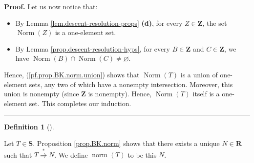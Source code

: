 \documentclass[numbers=enddot,12pt,final,onecolumn,notitlepage]{scrartcl}%
\theoremstyle{definition}
\newtheorem{defi}[theo]{Definition}
\newenvironment{definition}[1][]
{\begin{defi}[#1]\begin{leftbar}}
{\end{leftbar}\end{defi}}
\newenvironment{proof}[1][Proof]{\noindent\textbf{#1.} }{\ \rule{0.5em}{0.5em}}
\begin{document}
\begin{proof}
Let us now notice that:

\begin{itemize}
\item By Lemma \ref{lem.descent-resolution-props} \textbf{(d)}, for every $Z\in\mathbf{Z}$, the set $\operatorname*{Norm}\left( Z\right)  $ is a one-element set.

\item By Lemma \ref{prop.descent-resolution-hyps}, for every $B\in\mathbf{Z}$ and $C\in\mathbf{Z}$, we have
$\operatorname*{Norm}\left(  B\right)  \cap\operatorname*{Norm}\left(
C\right)  \neq\varnothing$.
\end{itemize}

Hence, (\ref{pf.prop.BK.norm.union}) shows that $\operatorname*{Norm}\left(
T\right)  $ is a union of one-element sets, any two of which have a nonempty
intersection.
Moreover, this union is nonempty (since $\mathbf{Z}$ is nonempty). Hence,
$\operatorname*{Norm}\left(  T\right)  $ itself is a one-element set. This
completes our induction.
\end{proof}

\begin{definition}
Let $T\in\mathbf{S}$. Proposition \ref{prop.BK.norm} shows that there exists a
unique $N\in\mathbf{R}$ such that $T\overset{\ast}{\Rrightarrow}N$. We define
$\operatorname*{norm}\left(  T\right)  $ to be this $N$.
\end{definition}
\end{document}
